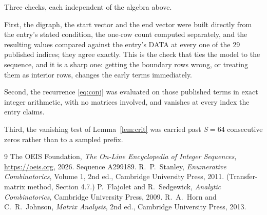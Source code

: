 \documentclass[11pt,a4paper]{article}
\theoremstyle{plain}
\theoremstyle{definition}
\begin{document}
Three checks, each independent of the algebra above.

First, the digraph, the start vector and the end vector were built directly from the
entry's stated condition, the one-row count computed separately, and the resulting values
compared against the entry's DATA at every one of the $29$ published indices; they
agree exactly. This is the check that ties the model to the sequence, and it is a sharp one:
getting the boundary rows wrong, or treating them as interior rows, changes the early terms
immediately.

Second, the recurrence \eqref{eq:conj} was evaluated on those published terms in exact
integer arithmetic, with no matrices involved, and vanishes at every index the entry claims.

Third, the vanishing test of Lemma~\ref{lem:crit} was carried past $S=64$ consecutive
zeros rather than to a sampled prefix.

\begin{thebibliography}{9}
 The OEIS Foundation, \emph{The On-Line Encyclopedia of Integer
Sequences}, \url{https://oeis.org}, 2026. Sequence A299189.
 R.~P.~Stanley, \emph{Enumerative Combinatorics}, Volume 1, 2nd ed.,
Cambridge University Press, 2011. (Transfer-matrix method, Section 4.7.)
 P.~Flajolet and R.~Sedgewick, \emph{Analytic Combinatorics}, Cambridge
University Press, 2009.
 R.~A.~Horn and C.~R.~Johnson, \emph{Matrix Analysis}, 2nd ed., Cambridge
University Press, 2013.
\end{thebibliography}
\end{document}
